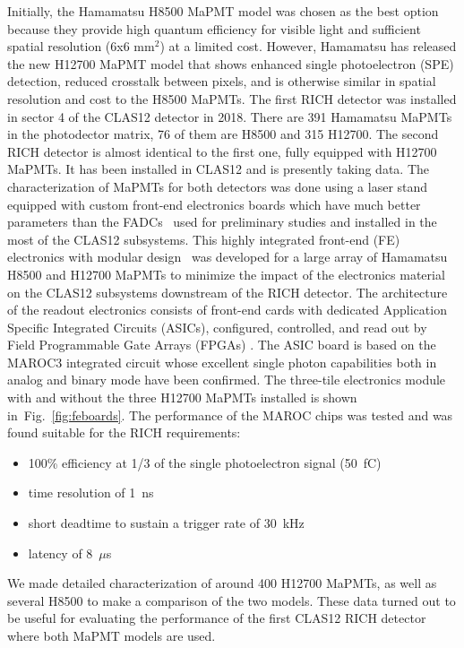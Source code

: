 Initially, the Hamamatsu H8500 MaPMT model \cite{H8500} was chosen as the best option because they provide high quantum efficiency for visible light and sufficient spatial resolution (6x6 mm$^2$) at a limited cost.
However, Hamamatsu has released the new H12700 MaPMT model  \cite{H12700} that shows enhanced single photoelectron (SPE) detection, reduced crosstalk between pixels, and is otherwise similar in spatial resolution and  cost to the H8500 MaPMTs.
The first RICH detector was installed in sector 4 of the CLAS12 detector in 2018.
There are 391 Hamamatsu MaPMTs  in the photodector matrix, 76 of them are H8500 and 315 H12700. 
The second RICH detector is almost identical to the first one, fully equipped with H12700 MaPMTs. It has been installed in CLAS12 and is presently taking data.
The characterization of MaPMTs for both detectors was done using a laser stand equipped with custom front-end electronics boards which have much better parameters than the FADCs~\cite{FADC250} used for preliminary studies and installed in the most of the CLAS12 subsystems.
This highly integrated front-end (FE) electronics with modular design~\cite{RICH_FE} was developed for a large array of Hamamatsu H8500 and H12700 MaPMTs to minimize the impact of the electronics material on the CLAS12 subsystems downstream of the RICH detector.
The architecture of the readout electronics consists of front-end cards with dedicated Application Specific Integrated Circuits (ASICs), configured, controlled, and read out by Field Programmable Gate Arrays (FPGAs) \cite{RICH_FE}.
The ASIC board is based on the MAROC3  integrated circuit \cite{MAROC} whose excellent single photon capabilities both in analog and binary mode have been confirmed.
The three-tile electronics module with and without the three H12700 MaPMTs installed is shown in~Fig.~\ref{fig:feboards}.
The performance of the MAROC chips was tested and was found suitable for the RICH requirements:
\begin{itemize}
	\item 100\% efficiency at 1/3 of the single photoelectron signal (50~fC)
	\item time resolution of 1~ns
	\item short deadtime to sustain a trigger rate of 30~kHz
	\item latency of 8~$\mu$s
\end{itemize}
We made detailed characterization of around 400 H12700 MaPMTs, as well as several H8500 to make a comparison of the two models.
These data turned out to be useful for evaluating the performance of the first CLAS12 RICH detector where both MaPMT models are used.

